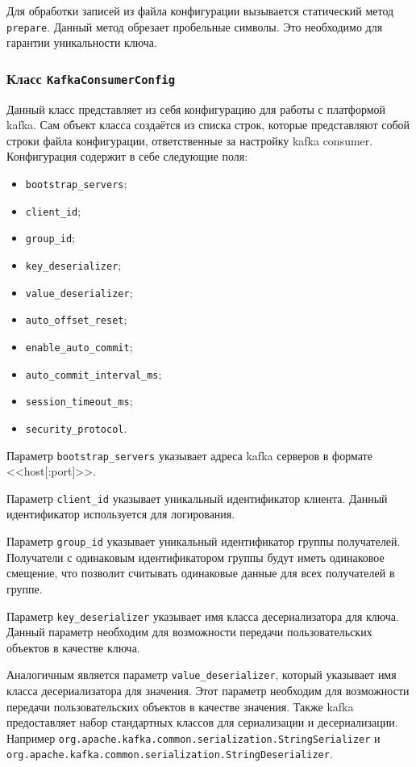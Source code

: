 Для обработки записей из файла конфигурации вызывается статический метод \texttt{prepare}.
Данный метод обрезает пробельные символы.
Это необходимо для гарантии уникальности ключа.

\subsubsection{Класс \texttt{KafkaConsumerConfig}}

Данный класс представляет из себя конфигурацию для работы с платформой kafka.
Сам объект класса создаётся из списка строк, которые представляют собой строки файла конфигурации, ответственные за настройку kafka consumer.
Конфигурация содержит в себе следующие поля:
\begin{itemize}
    \item \texttt{bootstrap\_servers};
    \item \texttt{client\_id};
    \item \texttt{group\_id};
    \item \texttt{key\_deserializer};
    \item \texttt{value\_deserializer};
    \item \texttt{auto\_offset\_reset};
    \item \texttt{enable\_auto\_commit};
    \item \texttt{auto\_commit\_interval\_ms};
    \item \texttt{session\_timeout\_ms};
    \item \texttt{security\_protocol}.
\end{itemize}

Параметр \texttt{bootstrap\_servers} указывает адреса kafka серверов в формате <<host[:port]>>.

Параметр \texttt{client\_id} указывает уникальный идентификатор клиента.
Данный идентификатор используется для логирования.

Параметр \texttt{group\_id} указывает уникальный идентификатор группы получателей.
Получатели с одинаковым идентификатором группы будут иметь одинаковое смещение, что позволит считывать одинаковые данные для всех получателей в группе.

Параметр \texttt{key\_deserializer} указывает имя класса десериализатора для ключа.
Данный параметр необходим для возможности передачи пользовательских объектов в качестве ключа.

Аналогичным является параметр \texttt{value\_deserializer}, который указывает имя класса десериализатора для значения.
Этот параметр необходим для возможности передачи пользовательских объектов в качестве значения.
Также kafka предоставляет набор стандартных классов для сериализации и десериализации.
Например \texttt{org.apache.kafka.common.serialization.StringSerializer} и \texttt{org.apache.kafka.common.serialization.StringDeserializer}.

